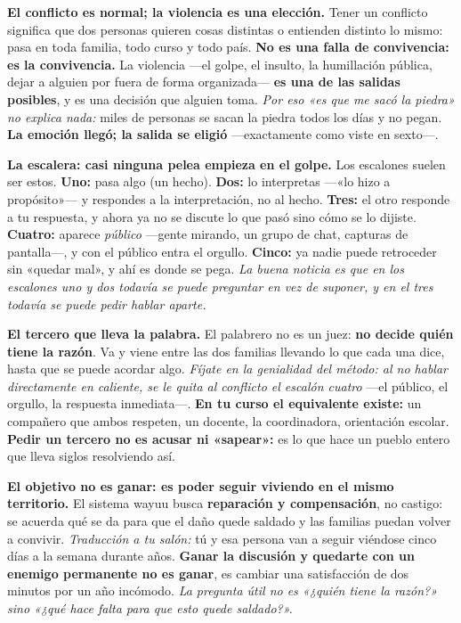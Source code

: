 \documentclass[11pt,letterpaper]{article}
\newcommand{\milcpaso}[3]{%
\Needspace{4\baselineskip}%
\begin{tcolorbox}[enhanced,colback=white,colframe=milcLinea,arc=1.5mm,boxrule=.9pt,
  left=14mm,right=4mm,top=3mm,bottom=3mm,before skip=4pt,after skip=4pt,
  fontupper=\RaggedRight,
  overlay={\node[anchor=north west,circle,fill=#2,text=white,inner sep=0pt,
    minimum size=7.4mm,font=\sffamily\bfseries\small]
    at ([xshift=3.6mm,yshift=-3.2mm]frame.north west) {#1};}]
#3
\end{tcolorbox}}
\begin{document}
\milcpaso{1}{milcTurquesa}{\textbf{El conflicto es normal; la violencia es una elección.} Tener un conflicto significa que dos personas quieren cosas distintas o entienden distinto lo mismo: pasa en toda familia, todo curso y todo país. \textbf{No es una falla de convivencia: es la convivencia.} La violencia ---el golpe, el insulto, la humillación pública, dejar a alguien por fuera de forma organizada--- \textbf{es una de las salidas posibles}, y es una decisión que alguien toma. \emph{Por eso «es que me sacó la piedra» no explica nada:} miles de personas se sacan la piedra todos los días y no pegan. \textbf{La emoción llegó; la salida se eligió} ---exactamente como viste en sexto---.}
\milcpaso{2}{milcTurquesa}{\textbf{La escalera: casi ninguna pelea empieza en el golpe.} Los escalones suelen ser estos. \textbf{Uno:} pasa algo (un hecho). \textbf{Dos:} lo interpretas ---«lo hizo a propósito»--- y respondes a la interpretación, no al hecho. \textbf{Tres:} el otro responde a tu respuesta, y ahora ya no se discute lo que pasó sino cómo se lo dijiste. \textbf{Cuatro:} aparece \emph{público} ---gente mirando, un grupo de chat, capturas de pantalla---, y con el público entra el orgullo. \textbf{Cinco:} ya nadie puede retroceder sin «quedar mal», y ahí es donde se pega. \emph{La buena noticia es que en los escalones uno y dos todavía se puede preguntar en vez de suponer, y en el tres todavía se puede pedir hablar aparte.}}
\milcpaso{3}{milcTurquesa}{\textbf{El tercero que lleva la palabra.} El palabrero no es un juez: \textbf{no decide quién tiene la razón}. Va y viene entre las dos familias llevando lo que cada una dice, hasta que se puede acordar algo. \emph{Fíjate en la genialidad del método: al no hablar directamente en caliente, se le quita al conflicto el escalón cuatro} ---el público, el orgullo, la respuesta inmediata---. \textbf{En tu curso el equivalente existe:} un compañero que ambos respeten, un docente, la coordinadora, orientación escolar. \textbf{Pedir un tercero no es acusar ni «sapear»:} es lo que hace un pueblo entero que lleva siglos resolviendo así.}
\milcpaso{4}{milcTurquesa}{\textbf{El objetivo no es ganar: es poder seguir viviendo en el mismo territorio.} El sistema wayuu busca \textbf{reparación y compensación}, no castigo: se acuerda qué se da para que el daño quede saldado y las familias puedan volver a convivir. \emph{Traducción a tu salón:} tú y esa persona van a seguir viéndose cinco días a la semana durante años. \textbf{Ganar la discusión y quedarte con un enemigo permanente no es ganar}, es cambiar una satisfacción de dos minutos por un año incómodo. \emph{La pregunta útil no es «¿quién tiene la razón?» sino «¿qué hace falta para que esto quede saldado?».}}
\end{document}
